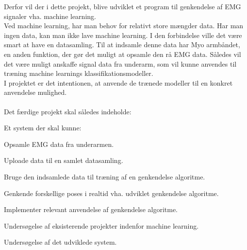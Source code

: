 Derfor vil der i dette projekt, blive udviklet et program til genkendelse af EMG signaler vha. machine learning. \\
Ved machine learning, har man behov for relativt store mængder data. Har man ingen data, kan man ikke lave machine learning. I den forbindelse ville det være smart at have en datasamling. Til at indsamle denne data har Myo armbåndet, en anden funktion, der gør det muligt at opsamle den rå EMG data. Således vil det være muligt anskaffe signal data fra underarm, som vil kunne anvendes til træning machine learnings klassifikationsmodeller. \\
I projektet er det intentionen, at anvende de trænede modeller til en konkret anvendelse mulighed. \\\\
Det færdige projekt skal således indeholde:
\begin{myItemize}
\item Et system der skal kunne:
	\begin{myItemize}
		\item Opsamle EMG data fra underarmen.
		\item Uploade data til en samlet datasamling.
		\item Bruge den indsamlede data til træning af en genkendelse algoritme.
		\item Genkende forskellige poses i realtid vha. udviklet genkendelse algoritme.
		\item Implementer relevant anvendelse af genkendelse algoritme.
	\end{myItemize}
\item Undersøgelse af eksisterende projekter indenfor machine learning.
\item Undersøgelse af det udviklede system.
\end{myItemize}

